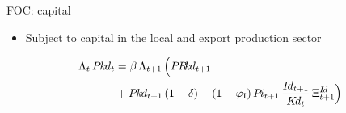   
  \begin{frame}{FOC: capital}
    \begin{itemize}
       \item Subject to capital in the local and export production sector  
    \end{itemize}
    \small
     \begin{align}
      \Lambda_t\,\Pkd_t &= \beta\,\Lambda_{t+1}\,\Big(\PRkd_{t+1} \notag \\
      &+ \Pkd_{t+1}\left(1 - \delta\right) + \left(1-\varphi_{\ii}\right) \Pii_{t+1}\,\frac{\Id_{t+1}}{\Kd_{t}} \, \Xi^{\Id}_{t+1}\Big)
     \end{align}
   \end{frame}
 
   